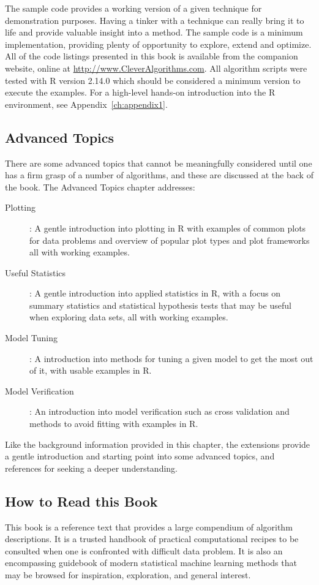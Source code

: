 The sample code provides a working version of a given technique for demonstration purposes. Having a tinker with a technique can really bring it to life and provide valuable insight into a method. The sample code is a minimum implementation, providing plenty of opportunity to explore, extend and optimize.
All of the code listings presented in this book is available from the companion website, online at \url{http://www.CleverAlgorithms.com}. All algorithm scripts were tested with R version 2.14.0 which should be considered a minimum version to execute the examples. For a high-level hands-on introduction into the R environment, see Appendix~\ref{ch:appendix1}.

\subsection{Advanced Topics}
There are some advanced topics that cannot be meaningfully considered until one has a firm grasp of a number of algorithms, and these are discussed at the back of the book. 
The Advanced Topics chapter addresses:

\begin{description}
	\item[Plotting]: A gentle introduction into plotting in R with examples of common plots for data problems and overview of popular plot types and plot frameworks all with working examples.
	\item[Useful Statistics]: A gentle introduction into applied statistics in R, with a focus on summary statistics and statistical hypothesis tests that may be useful when exploring data sets, all with working examples.
	\item[Model Tuning]: A introduction into methods for tuning a given model to get the most out of it, with usable examples in R.
	\item[Model Verification]: An introduction into model verification such as cross validation and methods to avoid fitting with examples in R.
\end{description}

Like the background information provided in this chapter, the extensions provide a gentle introduction and starting point into some advanced topics, and references for seeking a deeper understanding.

\subsection{How to Read this Book}
This book is a reference text that provides a large compendium of algorithm descriptions. 
It is a trusted handbook of practical computational recipes to be consulted when one is confronted with difficult data problem. It is also an encompassing guidebook of modern statistical machine learning methods that may be browsed for inspiration, exploration, and general interest.

